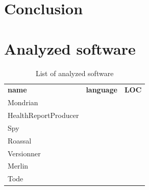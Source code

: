 \documentclass{sig-alternate}
\newcommand{\seclabel}[1]{\label{sec:#1}}
\begin{document}
\section{Conclusion}\seclabel{conclusion}







\appendix

\section{Analyzed software} \seclabel{listOfSoftware}

\begin{table}
\begin{tabular}{|l|l|l|}\hline
\textbf{name} & \textbf{language} & \textbf{LOC}\\
Mondrian\\
HealthReportProducer\\
Spy\\
Roassal\\
Versionner\\
Merlin\\
Tode\\
\end{tabular}
\caption{List of analyzed software}
\end{table}
\end{document}
